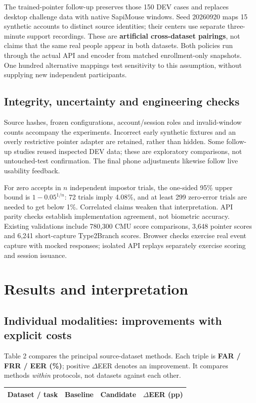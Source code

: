 \documentclass[10pt,a4paper]{article}
\newcommand{\smalltable}{\fontsize{8.5}{10.4}\selectfont}
\begin{document}
The trained-pointer follow-up preserves those 150 DEV cases and replaces desktop challenge data with native SapiMouse windows. Seed 20260920 maps 15 synthetic accounts to distinct source identities; their centers use separate three-minute support recordings. These are \textbf{artificial cross-dataset pairings}, not claims that the same real people appear in both datasets. Both policies run through the actual API and encoder from matched enrollment-only snapshots. One hundred alternative mappings test sensitivity to this assumption, without supplying new independent participants.

\subsection{Integrity, uncertainty and engineering checks}
Source hashes, frozen configurations, account/session roles and invalid-window counts accompany the experiments. Incorrect early synthetic fixtures and an overly restrictive pointer adapter are retained, rather than hidden. Some follow-up studies reused inspected DEV data; these are exploratory comparisons, not untouched-test confirmation. The final phone adjustments likewise follow live usability feedback.

For zero accepts in $n$ independent impostor trials, the one-sided 95\% upper bound is $1-0.05^{1/n}$: 72 trials imply 4.08\%, and at least 299 zero-error trials are needed to get below 1\%. Correlated claims weaken that interpretation. API parity checks establish implementation agreement, not biometric accuracy. Existing validations include 780,300 CMU score comparisons, 3,648 pointer scores and 6,241 short-capture Type2Branch scores. Browser checks exercise real event capture with mocked responses; isolated API replays separately exercise scoring and session issuance.

\newpage
\section{Results and interpretation}
\subsection{Individual modalities: improvements with explicit costs}
Table 2 compares the principal source-dataset methods. Each triple is \textbf{FAR / FRR / EER (\%)}; positive $\Delta$EER denotes an improvement. It compares methods \emph{within} protocols, not datasets against each other.
\begin{center}\smalltable
\begin{tabularx}{\linewidth}{@{}Xrrr@{}}
\toprule
\textbf{Dataset / task} & \textbf{Baseline} & \textbf{Candidate} & \textbf{$\Delta$EER (pp)}\\\midrule

\end{tabularx}
\end{center}
\end{document}
